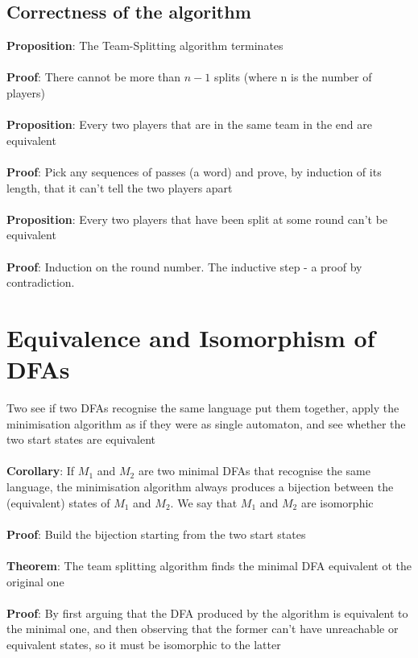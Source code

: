 \documentclass{article}[18pt]
\begin{document}
\subsection{Correctness of the algorithm}
\textbf{Proposition}: The Team-Splitting algorithm terminates\\
\\
\textbf{Proof}: There cannot be more than $n-1$ splits (where n is the number of players)\\
\\
\textbf{Proposition}: Every two players that are in the same team in the end are equivalent\\
\\
\textbf{Proof}: Pick any sequences of passes (a word) and prove, by induction of its length, that it can't tell the two players apart\\
\\
\textbf{Proposition}: Every two players that have been split at some round can't be equivalent\\
\\
\textbf{Proof}: Induction on the round number. The inductive step - a proof by contradiction.
\section{Equivalence and Isomorphism of DFAs}
Two see if two DFAs recognise the same language put them together, apply the minimisation algorithm as if they were as single automaton, and see whether the two start states are equivalent\\
\\
\textbf{Corollary}: If $M_1$ and $M_2$ are two minimal DFAs that recognise the same language, the minimisation algorithm always produces a bijection between the (equivalent) states of $M_1$ and $M_2$. We say that $M_1$ and $M_2$ are isomorphic\\
\\
\textbf{Proof}: Build the bijection starting from the two start states\\
\\
\textbf{Theorem}: The team splitting algorithm finds the minimal DFA equivalent ot the original one\\
\\
\textbf{Proof}: By first arguing that the DFA produced by the algorithm is equivalent to the minimal one, and then observing that the former can't have unreachable or equivalent states, so it must be isomorphic to the latter 
\end{document}
